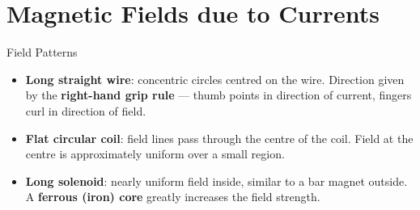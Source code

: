 \section{Magnetic Fields due to Currents}

\begin{keybox}{Field Patterns}
\begin{itemize}[itemsep=3pt]
  \item \textbf{Long straight wire}: concentric circles centred on the wire. Direction given by the \textbf{right-hand grip rule} — thumb points in direction of current, fingers curl in direction of field.
  \item \textbf{Flat circular coil}: field lines pass through the centre of the coil. Field at the centre is approximately uniform over a small region.
  \item \textbf{Long solenoid}: nearly uniform field inside, similar to a bar magnet outside. A \textbf{ferrous (iron) core} greatly increases the field strength.
\end{itemize}
\end{keybox}

\vspace{1.2em}

